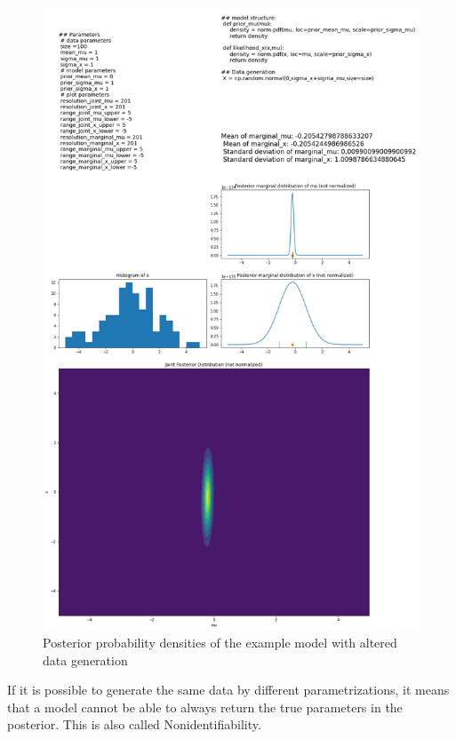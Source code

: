 \documentclass{article}
\begin{document}
\begin{figure}
	\includegraphics[width=\textwidth]{images/ground_truth_posterior_6.png}
	\caption[Posterior probability densities of the example model with altered data generation]{Posterior probability densities of the example model with altered data generation}
	\label{fig:ground_truth_posterior_6}
\end{figure}
If it is possible to generate the same data by different parametrizations, it means that a model cannot be able to always return the true parameters in the posterior. This is also called Nonidentifiability.
\end{document}

